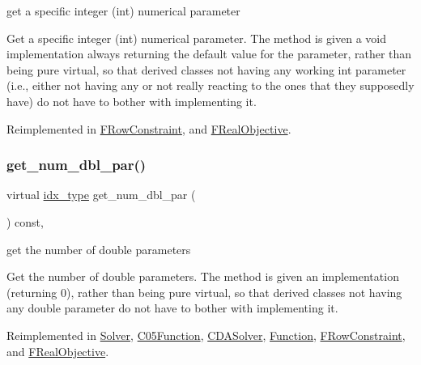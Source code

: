 get a specific integer (int) numerical parameter 

Get a specific integer (int) numerical parameter. The method is given a void implementation always returning the default value for the parameter, rather than being pure virtual, so that derived classes not having any working int parameter (i.\+e., either not having any or not really reacting to the ones that they supposedly have) do not have to bother with implementing it. 

Reimplemented in \mbox{\hyperlink{class_s_m_spp__di__unipi__it_1_1_f_row_constraint_aaaa5e72533153b149c26c1cc7ab1fe70}{F\+Row\+Constraint}}, and \mbox{\hyperlink{class_s_m_spp__di__unipi__it_1_1_f_real_objective_aaaa5e72533153b149c26c1cc7ab1fe70}{F\+Real\+Objective}}.

\mbox{\label{class_s_m_spp__di__unipi__it_1_1_thin_compute_interface_a03d2492bc7caa7e7821fa1bc4f06a36e}} 
\subsubsection{\texorpdfstring{get\+\_\+num\+\_\+dbl\+\_\+par()}{get\_num\_dbl\_par()}}
{\footnotesize\ttfamily virtual \mbox{\hyperlink{class_s_m_spp__di__unipi__it_1_1_thin_compute_interface_aa3d710629ad8c434286726ad810c3b47}{idx\+\_\+type}} get\+\_\+num\+\_\+dbl\+\_\+par (\begin{DoxyParamCaption}\item[{void}]{ }\end{DoxyParamCaption}) const\hspace{0.3cm}{\ttfamily [inline]}, {\ttfamily [virtual]}}



get the number of double parameters 

Get the number of double parameters. The method is given an implementation (returning 0), rather than being pure virtual, so that derived classes not having any double parameter do not have to bother with implementing it. 

Reimplemented in \mbox{\hyperlink{class_s_m_spp__di__unipi__it_1_1_solver_a842fd454acaded84baf6b77e0d61a950}{Solver}}, \mbox{\hyperlink{class_s_m_spp__di__unipi__it_1_1_c05_function_a842fd454acaded84baf6b77e0d61a950}{C05\+Function}}, \mbox{\hyperlink{class_s_m_spp__di__unipi__it_1_1_c_d_a_solver_a842fd454acaded84baf6b77e0d61a950}{C\+D\+A\+Solver}}, \mbox{\hyperlink{class_s_m_spp__di__unipi__it_1_1_function_a842fd454acaded84baf6b77e0d61a950}{Function}}, \mbox{\hyperlink{class_s_m_spp__di__unipi__it_1_1_f_row_constraint_a842fd454acaded84baf6b77e0d61a950}{F\+Row\+Constraint}}, and \mbox{\hyperlink{class_s_m_spp__di__unipi__it_1_1_f_real_objective_a842fd454acaded84baf6b77e0d61a950}{F\+Real\+Objective}}.

